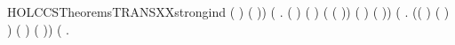 \begin{SaveVerbatim}{HOLCCSTheoremsTRANSXXstrongind}
             ( \HOLSymConst{\ensuremath{\parallel}} )  ( \HOLSymConst{\ensuremath{\parallel}} )) \HOLSymConst{\HOLTokenConj{}}
       (\HOLSymConst{\HOLTokenForall{}}    .
             \HOLTokenTransBegin{} \HOLTokenTransEnd {} \HOLSymConst{\HOLTokenConj{}}   ( )  \HOLSymConst{\HOLTokenConj{}}
             \HOLTokenTransBegin{} ( )\HOLTokenTransEnd {} \HOLSymConst{\HOLTokenConj{}}
              ( ( ))  \HOLSymConst{\HOLTokenImp{}}
             ( \HOLSymConst{\ensuremath{\parallel}} ) \HOLConst{\ensuremath{\tau}} ( \HOLSymConst{\ensuremath{\parallel}} )) \HOLSymConst{\HOLTokenConj{}}
       (\HOLSymConst{\HOLTokenForall{}}    .
             \HOLTokenTransBegin{}\HOLTokenTransEnd {} \HOLSymConst{\HOLTokenConj{}}     \HOLSymConst{\HOLTokenConj{}}
            (( \HOLSymConst{=} \HOLConst{\ensuremath{\tau}}) \HOLSymConst{\HOLTokenDisj{}} ( \HOLSymConst{=}  ) \HOLSymConst{\HOLTokenConj{}}  \HOLConst{\HOLTokenNotIn{}}  \HOLSymConst{\HOLTokenConj{}}   \HOLConst{\HOLTokenNotIn{}} ) \HOLSymConst{\HOLTokenImp{}}
             (\HOLConst{\ensuremath{\nu}}  )  (\HOLConst{\ensuremath{\nu}}  )) \HOLSymConst{\HOLTokenConj{}}
       (\HOLSymConst{\HOLTokenForall{}}   .
             \HOLTokenTransBegin{}\HOLTokenTransEnd {} \HOLSymConst{\HOLTokenConj{}}     \HOLSymConst{\HOLTokenImp{}}

\end{SaveVerbatim}
